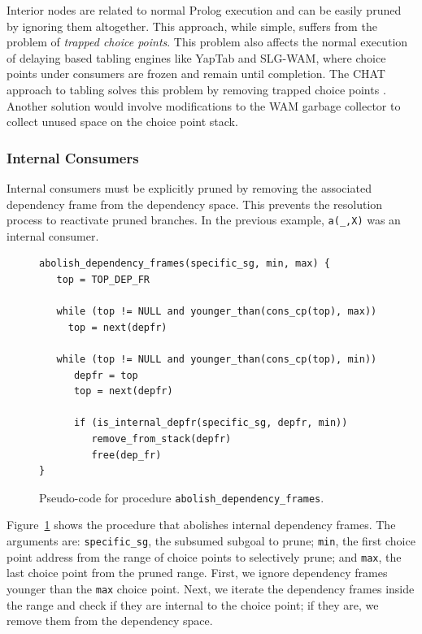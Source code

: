 Interior nodes are related to normal Prolog execution and can be easily pruned
by ignoring them altogether. This approach, while simple, suffers from the problem of \textit{trapped
choice points}. This problem also affects the normal execution of delaying based tabling engines like
YapTab and SLG-WAM, where choice points under consumers are frozen and remain until completion.
The CHAT approach to tabling solves this problem by removing trapped choice points \cite{Demoen-99b}.
Another solution would involve modifications to the WAM garbage collector to collect unused space on
the choice point stack.

\subsubsection{Internal Consumers}   
   
Internal consumers must be explicitly pruned by removing the associated
dependency frame from the dependency space. This prevents the resolution process to reactivate pruned
branches. In the previous example, \texttt{a(\_,X)} was an internal consumer.

\begin{figure}[ht]
\begin{Verbatim}
abolish_dependency_frames(specific_sg, min, max) {
   top = TOP_DEP_FR
   
   while (top != NULL and younger_than(cons_cp(top), max))
     top = next(depfr)
     
   while (top != NULL and younger_than(cons_cp(top), min))
      depfr = top
      top = next(depfr)

      if (is_internal_depfr(specific_sg, depfr, min))
         remove_from_stack(depfr)
         free(dep_fr)
}
\end{Verbatim}
\caption{Pseudo-code for procedure \texttt{abolish\_dependency\_frames}.}
\label{fig:abolish_dependency_frames}
\end{figure}
   
Figure~\ref{fig:abolish_dependency_frames} shows the procedure that abolishes internal dependency frames.
The arguments are: \texttt{specific\_sg}, the subsumed subgoal to prune; \texttt{min}, the first choice
point address from the range of choice points to selectively prune; and \texttt{max}, the last choice point
from the pruned range. First, we ignore dependency frames younger than the \texttt{max} choice point.
Next, we iterate the dependency frames inside the range and check if they are internal to the choice point;
if they are, we remove them from the dependency space.

